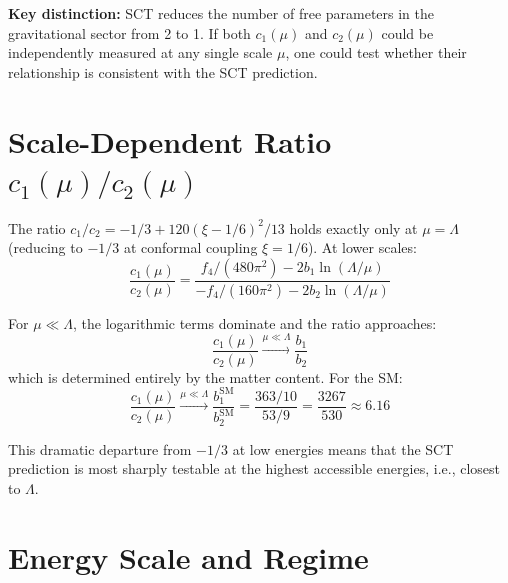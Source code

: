 \documentclass[11pt,a4paper]{article}
\begin{document}
\vspace{0.5em}
\noindent
\textbf{Key distinction:} SCT reduces the number of free parameters in the gravitational sector from 2 to 1. If both $c_1(\mu)$ and $c_2(\mu)$ could be independently measured at any single scale $\mu$, one could test whether their relationship is consistent with the SCT prediction.

\section{Scale-Dependent Ratio $c_1(\mu)/c_2(\mu)$}

The ratio $c_1/c_2 = -1/3 + 120(\xi-1/6)^2/13$ holds exactly only at $\mu = \Lambda$ (reducing to $-1/3$ at conformal coupling $\xi = 1/6$). At lower scales:
\begin{equation}
  \frac{c_1(\mu)}{c_2(\mu)} = \frac{f_4/(480\pi^2) - 2b_1\ln(\Lambda/\mu)}{-f_4/(160\pi^2) - 2b_2\ln(\Lambda/\mu)}
\end{equation}

For $\mu \ll \Lambda$, the logarithmic terms dominate and the ratio approaches:
\begin{equation}
  \frac{c_1(\mu)}{c_2(\mu)} \xrightarrow{\mu \ll \Lambda} \frac{b_1}{b_2}
\end{equation}
which is determined entirely by the matter content. For the SM:
\begin{equation}
  \frac{c_1(\mu)}{c_2(\mu)} \xrightarrow{\mu \ll \Lambda} \frac{b_1^{\text{SM}}}{b_2^{\text{SM}}} = \frac{363/10}{53/9} = \frac{3267}{530} \approx 6.16
\end{equation}

This dramatic departure from $-1/3$ at low energies means that the SCT prediction is most sharply testable at the highest accessible energies, i.e., closest to $\Lambda$.

\section{Energy Scale and Regime}
\end{document}
